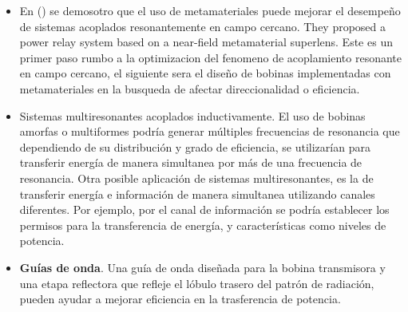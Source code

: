 \documentclass{intech}
\begin{document}
\begin{itemize}
\item En (\cite{meta}) se demosotro que el uso de metamateriales puede mejorar el desempeño de sistemas acoplados resonantemente en campo cercano. They proposed a power relay system based on a near-field metamaterial superlens.
Este es un primer paso rumbo a la optimizacion del fenomeno de acoplamiento resonante en campo cercano,
el siguiente sera el diseño de bobinas implementadas con metamateriales en la busqueda de afectar direccionalidad
o eficiencia.
\item Sistemas multiresonantes acoplados inductivamente. El uso de bobinas amorfas o multiformes podr{\'i}a generar m\'ultiples frecuencias de resonancia
que dependiendo de su distribuci\'on y grado de eficiencia, se utilizar{\'i}an para transferir energ{\'i}a de manera simultanea por m\'as de una frecuencia de resonancia.
Otra posible aplicaci\'on de sistemas multiresonantes,  es la de transferir energ{\'i}a e informaci\'on de manera simultanea utilizando
canales diferentes. Por ejemplo, por el canal de informaci\'on se podr{\'i}a establecer los permisos para la transferencia de energ{\'i}a, y caracter{\'i}sticas como niveles
de potencia.
\item {\bf Gu{\'i}as de onda}. Una gu{\'i}a de onda diseñada para la bobina transmisora y una etapa reflectora que refleje el l\'obulo trasero del patr\'on de radiaci\'on, pueden ayudar a mejorar eficiencia en la trasferencia de potencia.
\end{itemize}



\end{document}
